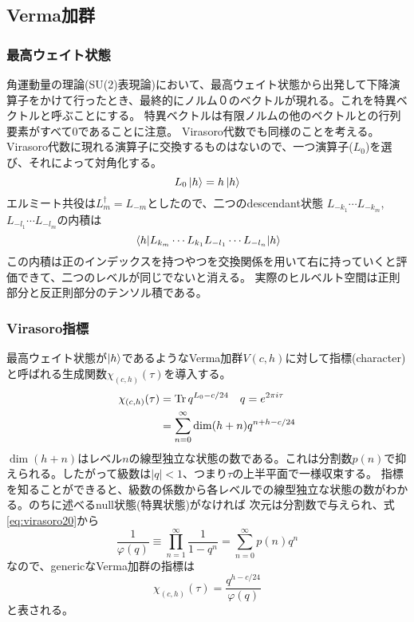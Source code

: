 \documentclass[11pt, aps, longbibliography]{article}
\numberwithin{equation}{section}
\begin{document}
    \subsection{Verma加群}
        \subsubsection{最高ウェイト状態}
        角運動量の理論(SU(2)表現論)において、最高ウェイト状態から出発して下降演算子をかけて行ったとき、最終的にノルム０のベクトルが現れる。これを特異ベクトルと呼ぶことにする。
        特異ベクトルは有限ノルムの他のベクトルとの行列要素がすべて0であることに注意。
        Virasoro代数でも同様のことを考える。Virasoro代数に現れる演算子に交換するものはないので、一つ演算子($L_0$)を選び、それによって対角化する。
        \begin{equation}\label{eq:verma1-1}
            L_0 \ket{h} = h \ket{h}
        \end{equation}
        エルミート共役は$L_m^\dagger = L_{-m}$としたので、二つのdescendant状態
        $L_{-k_1}\cdots L_{-k_m} $,$L_{-l_1}\cdots L_{-l_m} $の内積は
        \begin{equation}\label{eq:verma1-2}
            \expval{L_{k_m}\cdots L_{k_1}L_{-l_1}\cdots L_{-l_n}}{h}
        \end{equation}
        この内積は正のインデックスを持つやつを交換関係を用いて右に持っていくと評価できて、二つのレベルが同じでないと消える。
        実際のヒルベルト空間は正則部分と反正則部分のテンソル積である。

        \subsubsection{Virasoro指標}
        最高ウェイト状態が$\ket{h}$であるようなVerma加群$V(c,h)$に対して指標(character)と呼ばれる生成関数$\chi_{(c,h)}(\tau)$を導入する。
        \begin{align}\label{eq:verma2-1}
            \chi_{(c,h)}(\tau) &= \Tr q^{L_0-c/24} \quad q = e^{2\pi i \tau} \notag \\
            &= \sum_{n=0}^{\infty}\dim(h+n)q^{n+h-c/24}
        \end{align}
        $\dim(h+n)$はレベル$n$の線型独立な状態の数である。これは分割数$p(n)$で抑えられる。したがって級数は$|q|<1$、つまり$\tau$の上半平面で一様収束する。
        指標を知ることができると、級数の係数から各レベルでの線型独立な状態の数がわかる。のちに述べるnull状態(特異状態)がなければ
        次元は分割数で与えられ、式\eqref{eq:virasoro20}から
        \begin{equation}\label{eq:verma2-2}
            \frac{1}{\varphi(q)} \equiv \prod_{n=1}^{\infty} \frac{1}{1-q^n} = \sum_{n=0}^{\infty}p(n)q^n
        \end{equation}
        なので、genericなVerma加群の指標は
        \begin{equation}\label{eq:verma2-3}
            \chi_{(c,h)}(\tau) = \frac{q^{h-c/24}}{\varphi(q)}
        \end{equation}
        と表される。
\end{document}

